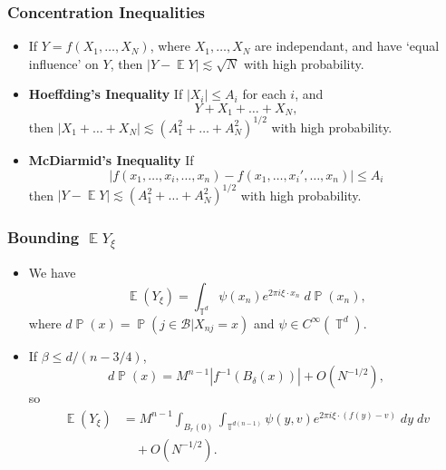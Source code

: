 \documentclass[handout,usenames,dvipsnames]{beamer}
\DeclareMathOperator{\TT}{\mathbb{T}}
\DeclareMathOperator{\PP}{\mathbb{P}}
\DeclareMathOperator{\EE}{\mathbb{E}}
\begin{document}
\begin{frame}
    \frametitle{Concentration Inequalities}

    \begin{itemize}
        \item If $Y = f(X_1,\dots,X_N)$, where $X_1,\dots,X_N$ are independant, and have `equal influence' on $Y$, then $|Y - \EE Y| \lesssim \sqrt{N}$ with high probability.

        \item {\bf Hoeffding's Inequality} If $|X_i| \leq A_i$ for each $i$, and
        \[ Y + X_1 + \dots + X_N, \]
        then $|X_1 + \dots + X_N | \lesssim (A_1^2 + \dots + A_N^2)^{1/2}$ with high probability.

        \item {\bf McDiarmid's Inequality} If
        \[ |f(x_1,\dots,x_i,\dots,x_n) - f(x_1,\dots,x_i',\dots,x_n)| \leq A_i \]
        then $|Y - \EE Y| \lesssim (A_1^2 + \dots + A_N^2)^{1/2}$ with high probability.
    \end{itemize}
\end{frame}

\begin{frame}
    \frametitle{Bounding $\EE Y_\xi$}

    \begin{itemize}
        \item We have
        \[ \EE(Y_\xi) = \int_{\TT^d} \psi(x_n) e^{2 \pi i \xi \cdot x_n}\; d\PP(x_n), \]
        where $d\PP(x) = \PP(j \in \mathcal{B} | X_{nj} = x)$ and $\psi \in C^\infty(\TT^d)$.

        \item If $\beta \leq d/(n-3/4)$,
        \[ d\PP(x) = M^{n-1} |f^{-1}(B_\delta(x))| + O(N^{-1/2}), \]
        so
        \begin{align*}
            \EE(Y_\xi) &= M^{n-1} \int_{B_r(0)} \int_{\TT^{d(n-1)}} \psi(y,v) e^{2 \pi i \xi \cdot (f(y) - v)}\; dy\; dv\\
            &\quad + O(N^{-1/2}).
        \end{align*}
    \end{itemize}
\end{frame}
\end{document}
